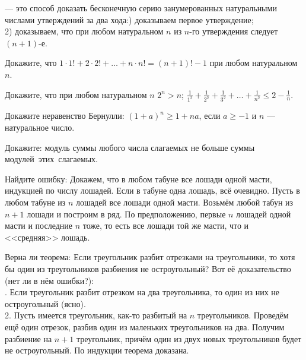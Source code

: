 \documentclass[12pt,a4paper]{article}
\begin{document}

\noindent
{} --- это способ доказать
бесконечную серию занумерованных натуральными числами
утверждений за два хода:) 
доказываем первое утверждение;\\
 2) 
доказываем, что при любом натуральном $n$ из $n$-го
утверждения следует $(n+1)$-е.

\smallskip



Докажите, что $1\cdot1!+2\cdot2!+\dots+n\cdot n!=(n+1)!-1$
при любом натуральном $n$.





Докажите, что при любом натуральном $n$
 $2^n>n$;
$\displaystyle{\frac1{1^2}+\frac1{2^2}+\frac1{3^2}+\dots
+\frac1{n^2}\leq 2-\frac1{n}}$.


Докажите неравенство Бернулли: $(1+a)^n\geq1+na$, если $a\geq-1$
и $n$ --- натуральное число.

Докажите: модуль суммы любого числа слагаемых не больше
суммы модулей~этих~слагаемых.



Найдите ошибку:
 Докажем, что в любом табуне все лошади одной масти, индукцией по числу лошадей.
Если в табуне одна лошадь, всё очевидно. %
Пусть в любом табуне из $n$ лошадей все лошади одной
масти. Возьмём любой табун из $n+1$ лошади и построим в ряд.
По предположению, первые $n$ лошадей одной масти и последние $n$ тоже, то есть все лошади той же масти, что и <<средняя>> лошадь.


 Верна ли теорема:  Если треугольник разбит отрезками
на треугольники, то хотя бы один из треугольников разбиения не
остроугольный?
Вот е\"е доказательство (нет ли в н\"ем ошибки?):\\
{. Если треугольник разбит отрезком на два треугольника,
то один из них не остроугольный (ясно).\\
2. Пусть имеется треугольник, как-то разбитый на $n$ треугольников.
Провед\"ем ещ\"е один отрезок, разбив один из маленьких треугольников
на два. Получим разбиение на $n+1$ треугольник, прич\"ем один из
двух новых треугольников будет не остроугольный.
По индукции теорема доказана.}
\end{document}
